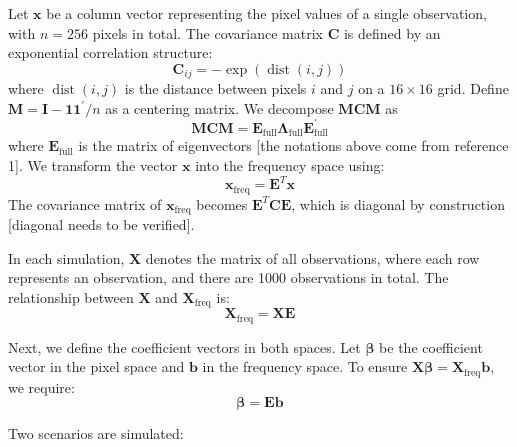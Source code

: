 \documentclass[12pt]{article}
\begin{document}
Let \( \mathbf{x} \) be a column vector representing the pixel values of a single observation, with \( n = 256 \) pixels in total. The covariance matrix \( \mathbf{C} \) is defined by an exponential correlation structure: 
\[
\mathbf{C}_{ij} = -\exp(\operatorname{dist}(i,j))
\]
where \( \operatorname{dist}(i,j) \) is the distance between pixels \( i \) and \( j \) on a \( 16 \times 16 \) grid. Define \( \mathbf{M} = \mathbf{I} - \mathbf{1} \mathbf{1}^{\prime} / n \) as a centering matrix. We decompose \( \mathbf{MCM} \) as
\[
\mathbf{MCM} = \mathbf{E}_{\text{full}} \mathbf{\Lambda}_{\text{full}} \mathbf{E}_{\text{full}}^{\prime}
\]
where \( \mathbf{E}_{\text{full}} \) is the matrix of eigenvectors [the notations above come from reference 1]. We transform the vector \( \mathbf{x} \) into the frequency space using:
\[
\mathbf{x}_{\text{freq}} = \mathbf{E}^T \mathbf{x}
\]
The covariance matrix of \( \mathbf{x}_{\text{freq}} \) becomes \( \mathbf{E}^T \mathbf{C} \mathbf{E} \), which is diagonal by construction [diagonal needs to be verified].

In each simulation, \( \mathbf{X} \) denotes the matrix of all observations, where each row represents an observation, and there are 1000 observations in total. The relationship between \( \mathbf{X} \) and \( \mathbf{X}_{\mathrm{freq}} \) is:
\[
\mathbf{X}_{\mathrm{freq}} = \mathbf{X} \mathbf{E}
\]

Next, we define the coefficient vectors in both spaces. Let \( \boldsymbol{\beta} \) be the coefficient vector in the pixel space and \( \mathbf{b} \) in the frequency space. To ensure \( \mathbf{X} \boldsymbol{\beta} = \mathbf{X}_{\mathrm{freq}} \mathbf{b} \), we require:
\[
\boldsymbol{\beta} = \mathbf{E} \mathbf{b}
\]

Two scenarios are simulated:
\end{document}
